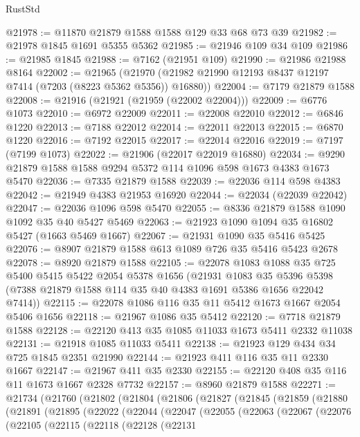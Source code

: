\begin{lexlean}{RustStd}
\begin{coremodule}
@21978 := @11870 @21879 @1588 @1588 @129 @33 @68 @73 @39
@21982 := @21978 @1845 @1691 @5355 @5362
@21985 := @21946 @109 @34 @109
@21986 := @21985 @1845
@21988 := @7162 (@21951 @109)
@21990 := @21986 @21988 @8164
@22002 := @21965
    (@21970 (@21982 @21990 @12193 @8437 @12197 @7414 (@7203 (@8223 @5362 @5356)) @16880))
@22004 := @7179 @21879 @1588
@22008 := @21916 (@21921 (@21959 (@22002 @22004)))
@22009 := @6776 @1073
@22010 := @6972 @22009
@22011 := @22008 @22010
@22012 := @6846 @1220
@22013 := @7188 @22012
@22014 := @22011 @22013
@22015 := @6870 @1220
@22016 := @7192 @22015
@22017 := @22014 @22016
@22019 := @7197 (@7199 @1073)
@22022 := @21906 (@22017 @22019 @16880)
@22034 := @9290 @21879 @1588 @1588 @9294 @5372 @114 @1096 @598 @1673 @4383 @1673 @5470
@22036 := @7335 @21879 @1588
@22039 := @22036 @114 @598 @4383
@22042 := @21949 @4383 @21953 @16920
@22044 := @22034 (@22039 @22042)
@22047 := @22036 @1096 @598 @5470
@22055 := @8336 @21879 @1588 @1090 @1092 @35 @40 @5427 @5469
@22063 := @21923 @1090 @1094 @35 @16802 @5427 (@1663 @5469 @1667)
@22067 := @21931 @1090 @35 @5416 @5425
@22076 := @8907 @21879 @1588 @613 @1089 @726 @35 @5416 @5423 @2678
@22078 := @8920 @21879 @1588
@22105 := @22078
    @1083
    @1088
    @35
    @725
    @5400
    @5415
    @5422
    @2054
    @5378
    @1656
    (@21931
      @1083
      @35
      @5396
      @5398
      (@7388 @21879 @1588 @114 @35 @40 @4383 @1691 @5386 @1656 @22042 @7414))
@22115 := @22078 @1086 @116 @35 @11 @5412 @1673 @1667 @2054 @5406 @1656
@22118 := @21967 @1086 @35 @5412
@22120 := @7718 @21879 @1588
@22128 := @22120 @413 @35 @1085 @11033 @1673 @5411 @2332 @11038
@22131 := @21918 @1085 @11033 @5411
@22138 := @21923 @129 @434 @34 @725 @1845 @2351 @21990
@22144 := @21923 @411 @116 @35 @11 @2330 @1667
@22147 := @21967 @411 @35 @2330
@22155 := @22120 @408 @35 @116 @11 @1673 @1667 @2328 @7732
@22157 := @8960 @21879 @1588
@22271 := @21734
    (@21760
      (@21802
        (@21804
          (@21806
            (@21827
              (@21845
                (@21859
                  (@21880
                    (@21891
                      (@21895
                        (@22022
                          (@22044
                            (@22047
                              (@22055
                                (@22063
                                  (@22067
                                    (@22076
                                      (@22105
                                        (@22115
                                          (@22118
                                            (@22128
                                              (@22131

\end{coremodule}
\end{lexlean}
